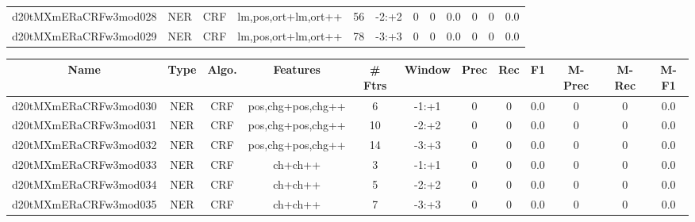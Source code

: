 \documentclass[a4paper]{article}
\begin{document}
\begin{landscape}
\begin{center}
\begin{tabular}{ |c|c|c|c|c|c|c|c|c|c|c|c|}
 
 	
 	\small{ d20tMXmERaCRFw3mod028 } & \small{ NER} & \small{  CRF }  & lm,pos,ort+lm,ort++  &  56 &  \small{  -2:+2 }  &  0 & 0 & 0.0  &  0 & 0 & 0.0 \\
 	

 
 	
 	\small{ d20tMXmERaCRFw3mod029 } & \small{ NER} & \small{  CRF }  & lm,pos,ort+lm,ort++  &  78 &  \small{  -3:+3 }  &  0 & 0 & 0.0  &  0 & 0 & 0.0 \\
 	
 \hline
\end{tabular}
\end{center}




\begin{center}
\begin{tabular}{ |c|c|c|c|c|c|c|c|c|c|c|c|} 
 \hline
 	Name & Type & Algo. & Features & \# Ftrs & Window & Prec & Rec & F1 & M-Prec & M-Rec & M-F1\\
 \hline

 	

 
 	
 	\small{ d20tMXmERaCRFw3mod030 } & \small{ NER} & \small{  CRF }  & pos,chg+pos,chg++  &  6 &  \small{  -1:+1 }  &  0 & 0 & 0.0  &  0 & 0 & 0.0 \\
 	

 
 	
 	\small{ d20tMXmERaCRFw3mod031 } & \small{ NER} & \small{  CRF }  & pos,chg+pos,chg++  &  10 &  \small{  -2:+2 }  &  0 & 0 & 0.0  &  0 & 0 & 0.0 \\
 	

 
 	
 	\small{ d20tMXmERaCRFw3mod032 } & \small{ NER} & \small{  CRF }  & pos,chg+pos,chg++  &  14 &  \small{  -3:+3 }  &  0 & 0 & 0.0  &  0 & 0 & 0.0 \\
 	

 
 	
 	\small{ d20tMXmERaCRFw3mod033 } & \small{ NER} & \small{  CRF }  & ch+ch++  &  3 &  \small{  -1:+1 }  &  0 & 0 & 0.0  &  0 & 0 & 0.0 \\
 	

 
 	
 	\small{ d20tMXmERaCRFw3mod034 } & \small{ NER} & \small{  CRF }  & ch+ch++  &  5 &  \small{  -2:+2 }  &  0 & 0 & 0.0  &  0 & 0 & 0.0 \\
 	

 
 	
 	\small{ d20tMXmERaCRFw3mod035 } & \small{ NER} & \small{  CRF }  & ch+ch++  &  7 &  \small{  -3:+3 }  &  0 & 0 & 0.0  &  0 & 0 & 0.0 \\
 	


\end{tabular}
\end{center}
\end{landscape}
\end{document}
